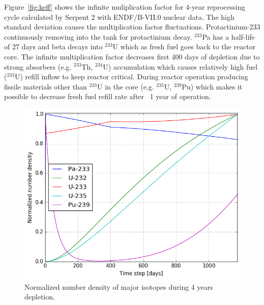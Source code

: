 \documentclass{anstrans}
\begin{document}
Figure~\ref{fig:keff} shows the infinite muliplication factor for 4-year reprocessing cycle calculated by Serpent 2 with ENDF/B-VII.0 nuclear data. The high standard deviation causes the multiplication factor fluctuations. Protactinium-233 continuously removing into the tank for protactinium decay. $^{233}$Pa has a half-life of 27 days and beta decays into $^{233}$U which as fresh fuel goes back to the reactor core. The infinite multiplication factor decreases first 400 days of depletion due to strong absorbers (e.g. $^{233}$Th, $^{234}$U) accumulation which causes relatively high fuel ($^{233}$U) refill inflow to keep reactor critical. During reactor operation producing fissile materials other than $^{233}$U in the core (e.g. $^{235}$U, $^{239}$Pu) which makes it possible to decrease fresh fuel refill rate after ~1 year of operation.

\begin{figure}[ht] %
  \centering
  \vspace{-0.8em}
  \includegraphics[width=1.03\linewidth]{fuel_composition.png}
  \caption{Normalized number density of major isotopes during 4 years depletion.}
  \label{fig:compos}
  \vspace{-0.8em}
\end{figure}
\end{document}
